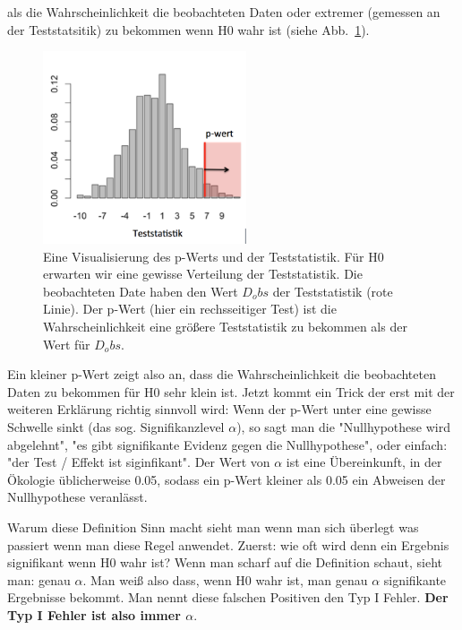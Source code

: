 \documentclass[a4paper,twoside]{tufte-book}\usepackage[]{graphicx}\usepackage[]{color}
\begin{document}
als die Wahrscheinlichkeit die beobachteten Daten oder extremer (gemessen an der Teststatsitik) zu bekommen wenn H0 wahr ist (siehe Abb.~\ref{fig: teststatistik}).


\begin{figure}[htb]
\begin{center}
\includegraphics[width = 6cm]{Teststatistik}
\caption{Eine Visualisierung des p-Werts und der Teststatistik. Für H0 erwarten wir eine gewisse Verteilung der Teststatistik. Die beobachteten Date haben den Wert $D_obs$ der Teststatistik (rote Linie). Der p-Wert (hier ein rechsseitiger Test) ist die Wahrscheinlichkeit eine größere Teststatistik zu bekommen als der Wert für $D_obs$.}
\label{fig: teststatistik}
\end{center}
\end{figure}

Ein kleiner p-Wert zeigt also an, dass die Wahrscheinlichkeit die beobachteten Daten zu bekommen für H0 sehr klein ist. Jetzt kommt ein Trick der erst mit der weiteren Erklärung richtig sinnvoll wird: Wenn der p-Wert unter eine gewisse Schwelle sinkt (das sog. Signifikanzlevel $\alpha$), so sagt man die "Nullhypothese wird abgelehnt", "es gibt signifikante Evidenz gegen die Nullhypothese", oder einfach: "der Test / Effekt ist siginfikant". Der Wert von $\alpha$ ist eine Übereinkunft, in der Ökologie üblicherweise 0.05, sodass ein p-Wert kleiner als 0.05 ein Abweisen der Nullhypothese veranlässt.  

Warum diese Definition Sinn macht sieht man wenn man sich überlegt was passiert wenn man diese Regel anwendet. Zuerst: wie oft wird denn ein Ergebnis signifikant wenn H0 wahr ist? Wenn man scharf auf die Definition schaut, sieht man: genau $\alpha$. 	Man weiß also dass, wenn H0 wahr ist, man genau $\alpha$ signifikante Ergebnisse bekommt. Man nennt diese falschen Positiven den Typ I Fehler. \textbf{Der Typ I Fehler ist also immer $\alpha$}. 
\end{document}
